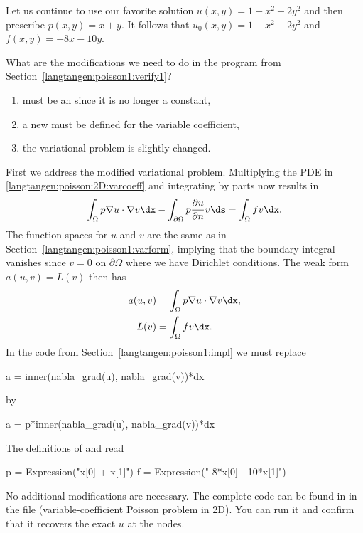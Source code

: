 Let us continue to use our favorite solution $u(x,y)=1+x^2+2y^2$ and
then prescribe $p(x,y)=x+y$. It follows that $u_0(x,y) = 1 + x^2 + 2y^2$
and $f(x,y)=-8x-10y$.

What are the modifications we need to do in the 
program from Section~\ref{langtangen:poisson1:verify1}?
\begin{enumerate}
  \item {} must be an  since it is no longer
  a constant,

  \item a new   must be defined for the variable
  coefficient,

  \item the variational problem is slightly changed.
\end{enumerate}
First we address the modified variational problem. Multiplying the PDE
in \eqref{langtangen:poisson:2D:varcoeff} and integrating by parts now
results in
%
\begin{equation}
  \int_\Omega p\nabla u\cdot\nabla v\dx -
  \int_{\partial\Omega} p \frac{\partial u}{\partial n}v\ds = \int_\Omega
  fv\dx.
\end{equation}
%
The function spaces for $u$ and $v$ are the same as in
Section~\ref{langtangen:poisson1:varform}, implying that the boundary
integral vanishes since $v=0$ on $\partial\Omega$ where we have Dirichlet
conditions.  The weak form $a(u,v)=L(v)$ then has
\begin{align}
  a(u,v) &= \int_\Omega p\nabla u\cdot\nabla v\dx,
\\
  L(v) &= \int_\Omega fv\dx.
\end{align}
In the code from Section~\ref{langtangen:poisson1:impl} we must replace
\begin{python}
a = inner(nabla_grad(u), nabla_grad(v))*dx
\end{python}
by
\begin{python}
a = p*inner(nabla_grad(u), nabla_grad(v))*dx
\end{python}
The definitions of  and  read
\begin{python}
p = Expression("x[0] + x[1]")
f = Expression("-8*x[0] - 10*x[1]")
\end{python}
No additional modifications are necessary. The complete code can be
found in in the file\break {} (variable-coefficient Poisson problem in 2D). You can run it and confirm
that it recovers the exact $u$ at the nodes.

